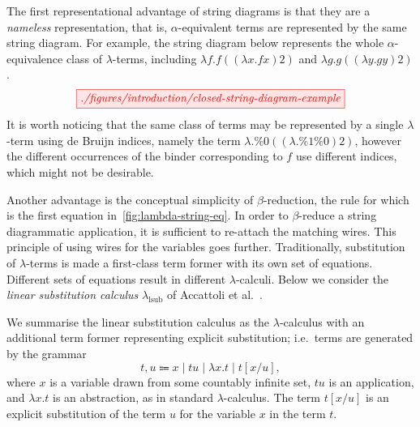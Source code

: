 The first representational advantage of string diagrams is that they are a \emph{nameless} representation, that is, $\alpha$-equivalent terms are represented by the same string diagram.
For example, the string diagram below represents the whole $\alpha$-equivalence class of $\lambda$-terms, including $\lambda f . f((\lambda x. f x) 2)$ and $\lambda g . g((\lambda y . g y) 2)$.
\[
    \tikzfig{./figures/introduction/closed-string-diagram-example}
\]
It is worth noticing that the same class of terms may be represented by a single $\lambda$-term using de Bruijn indices, namely the term $\lambda . \%0((\lambda . \%1 \%0) 2)$, however the different occurrences of the binder corresponding to $f$ use different indices, which might not be desirable.

Another advantage is the conceptual simplicity of $\beta$-reduction, the rule for which is the first equation in~\cref{fig:lambda-string-eq}.
In order to $\beta$-reduce a string diagrammatic application, it is sufficient to re-attach the matching wires.
This principle of using wires for the variables goes further.
Traditionally, substitution of $\lambda$-terms is made a first-class term former with its own set of equations.
Different sets of equations result in different $\lambda$-calculi.
Below we consider the \emph{linear substitution calculus} $\lambda_{\text{lsub}}$ of Accattoli et al.~\cite[Sec.~2]{accattoli2014nonstandard}.

We summarise the linear substitution calculus as the $\lambda$-calculus with an additional term former representing explicit substitution; i.e.\ terms are generated by the grammar
\begin{equation}
	t,u \Coloneqq x \mid t u \mid \lambda x. t \mid t [x / u],
  \label{eq:lambda_lsub_grammar}
\end{equation}
where $x$ is a variable drawn from some countably infinite set, $t u$ is an application, and $\lambda x. t$ is an abstraction, as in standard $\lambda$-calculus.
The term $t [x / u]$ is an explicit substitution of the term $u$ for the variable $x$ in the term $t$.

